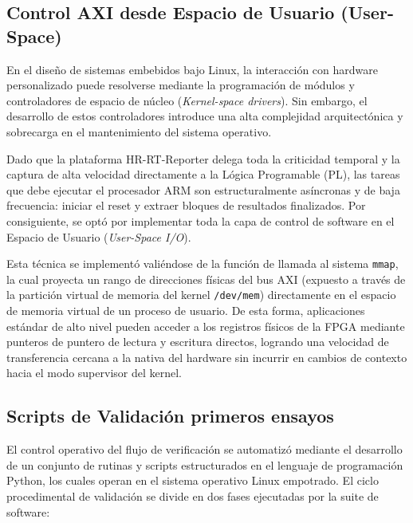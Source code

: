 
\subsection{Control AXI desde Espacio de Usuario (User-Space)}
\label{ssec:user_space_io}

En el diseño de sistemas embebidos bajo Linux, la interacción con hardware personalizado puede resolverse mediante la programación de módulos y controladores de espacio de núcleo (\textit{Kernel-space drivers}). Sin embargo, el desarrollo de estos controladores introduce una alta complejidad arquitectónica y sobrecarga en el mantenimiento del sistema operativo.

Dado que la plataforma HR-RT-Reporter delega toda la criticidad temporal y la captura de alta velocidad directamente a la Lógica Programable (PL), las tareas que debe ejecutar el procesador ARM son estructuralmente asíncronas y de baja frecuencia: iniciar el reset y extraer bloques de resultados finalizados. Por consiguiente, se optó por implementar toda la capa de control de software en el Espacio de Usuario (\textit{User-Space I/O}).

Esta técnica se implementó valiéndose de la función de llamada al sistema \texttt{mmap}, la cual proyecta un rango de direcciones físicas del bus AXI (expuesto a través de la partición virtual de memoria del kernel \texttt{/dev/mem}) directamente en el espacio de memoria virtual de un proceso de usuario. De esta forma, aplicaciones estándar de alto nivel pueden acceder a los registros físicos de la FPGA mediante punteros de puntero de lectura y escritura directos, logrando una velocidad de transferencia cercana a la nativa del hardware sin incurrir en cambios de contexto hacia el modo supervisor del kernel.

\subsection{Scripts de Validación primeros ensayos}
\label{ssec:scripts_recopilacion}

El control operativo del flujo de verificación se automatizó mediante el desarrollo de un conjunto de rutinas y scripts estructurados en el lenguaje de programación Python, los cuales operan en el sistema operativo Linux empotrado. El ciclo procedimental de validación se divide en dos fases ejecutadas por la suite de software:

